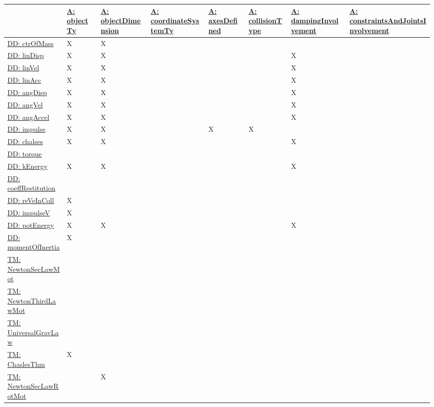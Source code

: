 \documentclass[12pt]{article}
\begin{document}
\begin{longtable}{l l l l l l l l}
\toprule
 & \hyperref[assumpOT]{A: objectTy} & \hyperref[assumpOD]{A: objectDimension} & \hyperref[assumpCST]{A: coordinateSystemTy} & \hyperref[assumpAD]{A: axesDefined} & \hyperref[assumpCT]{A: collisionType} & \hyperref[assumpDI]{A: dampingInvolvement} & \hyperref[assumpCAJI]{A: constraintsAndJointsInvolvement}
\\
\midrule
\endhead
\hyperref[DD:ctrOfMass]{DD: ctrOfMass} & X & X &  &  &  &  & 
\\
\hyperref[DD:linDisp]{DD: linDisp} & X & X &  &  &  & X & 
\\
\hyperref[DD:linVel]{DD: linVel} & X & X &  &  &  & X & 
\\
\hyperref[DD:linAcc]{DD: linAcc} & X & X &  &  &  & X & 
\\
\hyperref[DD:angDisp]{DD: angDisp} & X & X &  &  &  & X & 
\\
\hyperref[DD:angVel]{DD: angVel} & X & X &  &  &  & X & 
\\
\hyperref[DD:angAccel]{DD: angAccel} & X & X &  &  &  & X & 
\\
\hyperref[DD:impulse]{DD: impulse} & X & X &  & X & X &  & 
\\
\hyperref[DD:chalses]{DD: chalses} & X & X &  &  &  & X & 
\\
\hyperref[DD:torque]{DD: torque} &  &  &  &  &  &  & 
\\
\hyperref[DD:kEnergy]{DD: kEnergy} & X & X &  &  &  & X & 
\\
\hyperref[DD:coeffRestitution]{DD: coeffRestitution} &  &  &  &  &  &  & 
\\
\hyperref[DD:reVeInColl]{DD: reVeInColl} & X &  &  &  &  &  & 
\\
\hyperref[DD:impulseV]{DD: impulseV} & X &  &  &  &  &  & 
\\
\hyperref[DD:potEnergy]{DD: potEnergy} & X & X &  &  &  & X & 
\\
\hyperref[DD:momentOfInertia]{DD: momentOfInertia} & X &  &  &  &  &  & 
\\
\hyperref[TM:NewtonSecLawMot]{TM: NewtonSecLawMot} &  &  &  &  &  &  & 
\\
\hyperref[TM:NewtonThirdLawMot]{TM: NewtonThirdLawMot} &  &  &  &  &  &  & 
\\
\hyperref[TM:UniversalGravLaw]{TM: UniversalGravLaw} &  &  &  &  &  &  & 
\\
\hyperref[TM:ChaslesThm]{TM: ChaslesThm} & X &  &  &  &  &  & 
\\
\hyperref[TM:NewtonSecLawRotMot]{TM: NewtonSecLawRotMot} &  & X &  &  &  &  & 

\end{longtable}
\end{document}
